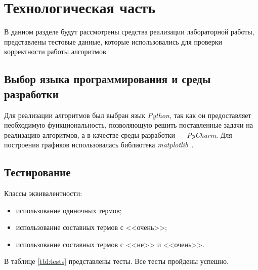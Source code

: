 \chapter{Технологическая часть}

В данном разделе будут рассмотрены средства реализации лабораторной работы, представлены тестовые данные, которые использовались для проверки корректности работы алгоритмов.

\section{Выбор языка программирования и среды \\разработки}
Для реализации алгоритмов был выбран язык \textit{Python}, так как он предоставляет необходимую функциональность, позволяющую решить поставленные задачи на реализацию алгоритмов, а в качестве среды разработки --- \textit{PyCharm}.
Для построения графиков использовалась библиотека \textit{matplotlib}~\cite{mpl}.


\section{Тестирование}
Классы эквивалентности:

\begin{itemize}[label=---]
    \item использование одиночных термов;
    \item использование составных термов с <<очень>>;
    \item использование составных термов с <<не>> и <<очень>>.
\end{itemize}

В таблице \ref{tbl:tests} представлены тесты. Все тесты пройдены успешно.

